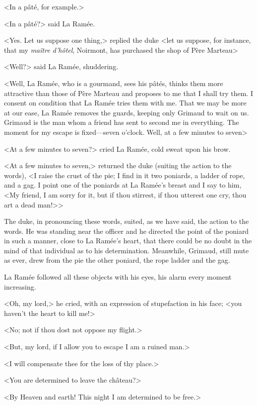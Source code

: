 <In a pâté, for example.>

<In a pâté?> said La Ramée.

<Yes. Let us suppose one thing,> replied the duke <let us suppose, for instance, that my \textit{maître d'hôtel}, Noirmont, has purchased the shop of Père Marteau\longdash>

<Well?> said La Ramée, shuddering.

<Well, La Ramée, who is a gourmand, sees his pâtés, thinks them more attractive than those of Père Marteau and proposes to me that I shall try them. I consent on condition that La Ramée tries them with me. That we may be more at our ease, La Ramée removes the guards, keeping only Grimaud to wait on us. Grimaud is the man whom a friend has sent to second me in everything. The moment for my escape is fixed—seven o'clock. Well, at a few minutes to seven\longdash>

<At a few minutes to seven?> cried La Ramée, cold sweat upon his brow.

<At a few minutes to seven,> returned the duke (suiting the action to the words), <I raise the crust of the pie; I find in it two poniards, a ladder of rope, and a gag. I point one of the poniards at La Ramée's breast and I say to him, <My friend, I am sorry for it, but if thou stirrest, if thou utterest one cry, thou art a dead man!>>

The duke, in pronouncing these words, suited, as we have said, the action to the words. He was standing near the officer and he directed the point of the poniard in such a manner, close to La Ramée's heart, that there could be no doubt in the mind of that individual as to his determination. Meanwhile, Grimaud, still mute as ever, drew from the pie the other poniard, the rope ladder and the gag.

La Ramée followed all these objects with his eyes, his alarm every moment increasing.

<Oh, my lord,> he cried, with an expression of stupefaction in his face; <you haven't the heart to kill me!>

<No; not if thou dost not oppose my flight.>

<But, my lord, if I allow you to escape I am a ruined man.>

<I will compensate thee for the loss of thy place.>

<You are determined to leave the château?>

<By Heaven and earth! This night I am determined to be free.>

